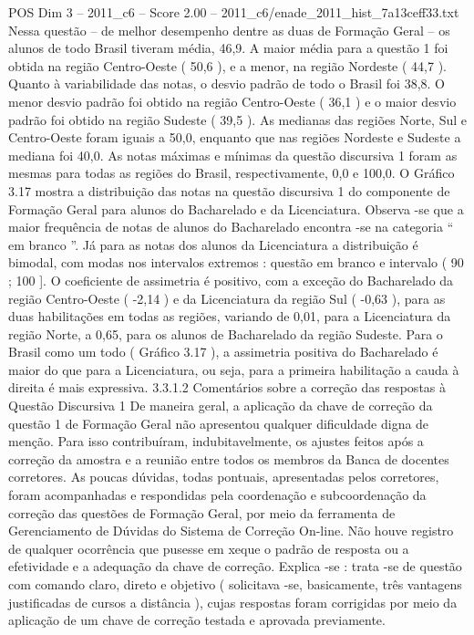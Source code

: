 \begin{textsample}{POS Dim 3 – 2011\_c6 – Score 2.00 – 2011\_c6/enade\_2011\_hist\_7a13ceff33.txt}
Nessa questão – de melhor desempenho dentre as duas de Formação Geral – os alunos de todo Brasil tiveram média, 46,9.
A maior média para a questão 1 foi obtida na região Centro-Oeste ( 50,6 ), e a menor, na região Nordeste ( 44,7 ).
Quanto à variabilidade das notas, o desvio padrão de todo o Brasil foi 38,8.
O menor desvio padrão foi obtido na região Centro-Oeste ( 36,1 ) e o maior desvio padrão foi obtido na região Sudeste ( 39,5 ).
As medianas das regiões Norte, Sul e Centro-Oeste foram iguais a 50,0, enquanto que nas regiões Nordeste e Sudeste a mediana foi 40,0.
As notas máximas e mínimas da questão discursiva 1 foram as mesmas para todas as regiões do Brasil, respectivamente, 0,0 e 100,0.
O Gráfico 3.17 mostra a distribuição das notas na questão discursiva 1 do componente de Formação Geral para alunos do Bacharelado e da Licenciatura.
Observa -se que a maior frequência de notas de alunos do Bacharelado encontra -se na categoria “ em branco ”.
Já para as notas dos alunos da Licenciatura a distribuição é bimodal, com modas nos intervalos extremos : questão em branco e intervalo ( 90 ; 100 ].
O coeficiente de assimetria é positivo, com a exceção do Bacharelado da região Centro-Oeste ( -2,14 ) e da Licenciatura da região Sul ( -0,63 ), para as duas habilitações em todas as regiões, variando de 0,01, para a Licenciatura da região Norte, a 0,65, para os alunos de Bacharelado da região Sudeste.
Para o Brasil como um todo ( Gráfico 3.17 ), a assimetria positiva do Bacharelado é maior do que para a Licenciatura, ou seja, para a primeira habilitação a cauda à direita é mais expressiva. 3.3.1.2 Comentários sobre a correção das respostas à Questão Discursiva 1 De maneira geral, a aplicação da chave de correção da questão 1 de Formação Geral não apresentou qualquer dificuldade digna de menção.
Para isso contribuíram, indubitavelmente, os ajustes feitos após a correção da amostra e a reunião entre todos os membros da Banca de docentes corretores.
As poucas dúvidas, todas pontuais, apresentadas pelos corretores, foram acompanhadas e respondidas pela coordenação e subcoordenação da correção das questões de Formação Geral, por meio da ferramenta de Gerenciamento de Dúvidas do Sistema de Correção On-line.
Não houve registro de qualquer ocorrência que pusesse em xeque o padrão de resposta ou a efetividade e a adequação da chave de correção.
Explica -se : trata -se de questão com comando claro, direto e objetivo ( solicitava -se, basicamente, três vantagens justificadas de cursos a distância ), cujas respostas foram corrigidas por meio da aplicação de um chave de correção testada e aprovada previamente.

\end{textsample}
